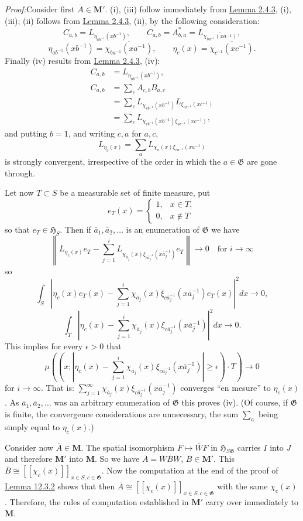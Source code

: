 \documentclass[12pt,b5paper,twoside]{article}
\newcommand{\Hspace}{\mathfrak H}
\newcommand{\M}{\mathbf M}
\newcommand{\Proof}{\par\noindent\textit{Proof:}\enspace}
\newcommand{\lemref}[1]{\hyperref[lem:#1]{Lemma #1}}
\begin{document}
\Proof Consider first $\overline A\in\M'$. (i), (iii) follow immediately
from \lemref{2.4.3}, (i), (iii); (ii) follows from \lemref{2.4.3}, (ii), by
the following consideration:
\[
 C_{a,b}=L_{\eta_{ab^{-1}}(xb^{-1})},
 \qquad C_{a,b}=A_{b,a}^*
 =L_{\overline{\chi_{ba^{-1}}(xa^{-1})}},
\]
\[
 \eta_{ab^{-1}}(xb^{-1})
 =\overline{\chi_{ba^{-1}}(xa^{-1})},
 \qquad
 \eta_c(x)=\overline{\chi_{c^{-1}}(xc^{-1})}.
\]
Finally (iv) results from \lemref{2.4.3}, (iv):
\begin{align*}
 C_{a,b}&=L_{\eta_{ab^{-1}}(xb^{-1})},\\
 C_{a,b}&=\sum_cA_{c,b}B_{a,c}\\
 &=\sum_cL_{\chi_{cb^{-1}}(xb^{-1})}
           L_{\xi_{ac^{-1}}(xc^{-1})}\\
 &=\sum_cL_{\chi_{cb^{-1}}(xb^{-1})\xi_{ac^{-1}}(xc^{-1})},
\end{align*}
and putting $b=1$, and writing $c,a$ for $a,c$,
\[
 L_{\eta_c(x)}
 =\sum_aL_{\chi_a(x)\xi_{ca^{-1}}(xa^{-1})}
\]
is strongly convergent, irrespective of the order in which the
$a\in\mathfrak G$ are gone through.

Let now $T\subset S$ be a measurable set of finite measure, put
\[
 e_T(x)=\begin{cases}
  1,&x\in T,\\
  0,&x\notin T
 \end{cases}
\]
so that $e_T\in\Hspace_S$. Then if $\bar a_1,\bar a_2,\ldots$ is an
enumeration of $\mathfrak G$ we have
\[
 \left\lVert L_{\eta_c(x)}e_T
 -\sum_{j=1}^i
 L_{\chi_{\bar a_j}(x)
       \xi_{c\bar a_j^{-1}}(x\bar a_j^{-1})}e_T
 \right\rVert\longrightarrow0
 \quad\text{for }i\to\infty
\]
so
\[
 \int_S\left|\eta_c(x)e_T(x)
 -\sum_{j=1}^i\chi_{\bar a_j}(x)
 \xi_{c\bar a_j^{-1}}(x\bar a_j^{-1})e_T(x)\right|^2dx\longrightarrow0,
\]
\[
 \int_T\left|\eta_c(x)
 -\sum_{j=1}^i\chi_{\bar a_j}(x)
 \xi_{c\bar a_j^{-1}}(x\bar a_j^{-1})\right|^2dx\longrightarrow0.
\]
This implies for every $\epsilon>0$ that
\[
 \mu\left((x;\left|\eta_c(x)-
 \sum_{j=1}^i\chi_{\bar a_j}(x)
 \xi_{c\bar a_j^{-1}}(x\bar a_j^{-1})\right|\geq\epsilon)\cdot T\right)
 \longrightarrow0
\]
for $i\to\infty$. That is:
$\sum_{j=1}^\infty\chi_{\bar a_j}(x)
\xi_{c\bar a_j^{-1}}(x\bar a_j^{-1})$ converges ``en mesure'' to
$\eta_c(x)$. As $\bar a_1,\bar a_2,\ldots$ was an arbitrary enumeration of
$\mathfrak G$ this proves (iv). (Of course, if $\mathfrak G$ is finite, the
convergence considerations are unnecessary, the sum $\sum_a$ being simply
equal to $\eta_c(x)$.)

Consider now $\overline A\in\M$. The spatial isomorphism
$F\mapsto\overline WF$ in $\Hspace_{S\mathfrak G}$ carries $I$ into $J$ and
therefore $\M'$ into $\M$. So we have
$\overline A=\overline W\overline B\overline W$, $\overline B\in\M'$. This
$\overline B\cong[[\chi_c(x)]]_{x\in S,c\in\mathfrak G}$. Now the computation
at the end of the proof of \lemref{12.3.2} shows that then
$\overline A\cong[[\chi_c(x)]]_{x\in S,c\in\mathfrak G}$ with the same
$\chi_c(x)$. Therefore, the rules of computation established in $\M'$ carry
over immediately to $\M$.
\end{document}

